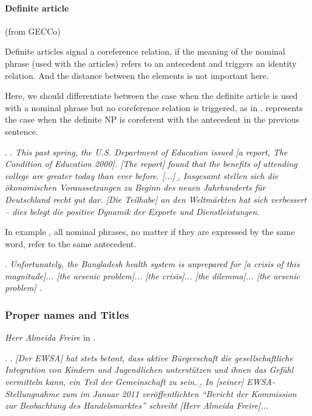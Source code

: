 \documentclass[a4paper]{article}
\begin{document}

\paragraph*{Definite article}
(from GECCo)

Definite articles signal a coreference relation, if the meaning of the nominal phrase (used with the articles) refers to an antecedent and triggers an identity relation. And the distance between the elements is not important here.

Here, we should differentiate between the case when the definite article is used with a nominal phrase but no coreference relation is triggered, as in \Next[b]. \Next[a] represents the case when the definite NP is coreferent with the antecedent in the previous sentence.

\ex.
\a. {\sl This past spring, the U.S. Department of Education issued [a report, The Condition of Education 2000]. [The report] found that the benefits of attending college are greater today than ever before. [...] }
\b. {\sl Insgesamt stellen sich die ökonomischen Voraussetzungen zu Beginn des neuen Jahrhunderts für Deutschland recht gut dar. [Die Teilhabe] an den Weltmärkten hat sich verbessert -- dies belegt die positive Dynamik der Exporte und Dienstleistungen}.

In example \Next, all nominal phrases, no matter if they are expressed by the same word, refer to the same antecedent.%

\ex. {\sl Unfortunately, the Bangladesh health system is unprepared for [a crisis of this magnitude]...  [the arsenic problem]... [the crisis]... [the dilemma]... [the arsenic problem] .}

\subsubsection{Proper names and Titles}

{\sl Herr Almeida Freire} in \Next[b].%

\ex. 
\a. \label{eswa}{\sl [Der EWSA] hat stets betont, dass aktive Bürgerschaft die gesellschaftliche Integration von Kindern und Jugendlichen unterstützen und ihnen das Gefühl vermitteln kann, ein Teil der Gemeinschaft zu sein.}
\b. 
{\sl In [seiner] EWSA-Stellungnahme zum im Januar 2011 veröffentlichten ``Bericht der Kommission zur Beobachtung des Handelsmarktes'' schreibt [Herr Almeida Freire]...}
\end{document}
